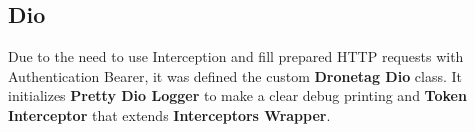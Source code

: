 \subsection{Dio}\label{subsec:dio-class}
Due to the need to use Interception and fill prepared HTTP requests with Authentication Bearer, it was defined the custom \textbf{Dronetag Dio} class.
It initializes \textbf{Pretty Dio Logger} to make a clear debug printing and \textbf{Token Interceptor} that extends \textbf{Interceptors Wrapper}.
